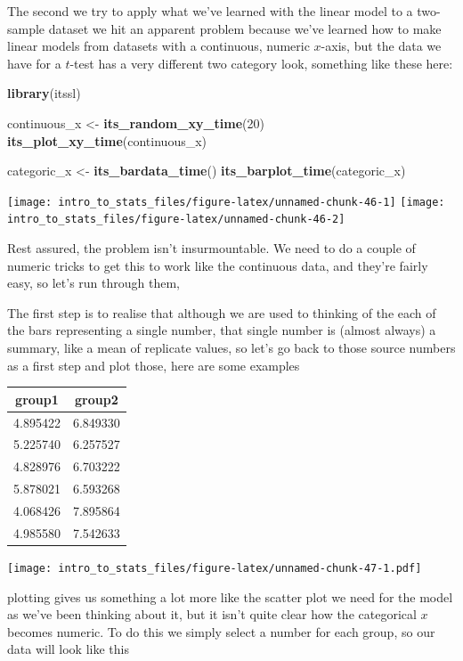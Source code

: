 \documentclass[
]{book}
\newenvironment{Shaded}{\begin{snugshade}}{\end{snugshade}}
\newcommand{\DecValTok}[1]{\textcolor[rgb]{0.00,0.00,0.81}{#1}}
\newcommand{\KeywordTok}[1]{\textcolor[rgb]{0.13,0.29,0.53}{\textbf{#1}}}
\newcommand{\NormalTok}[1]{#1}
\newcommand{\StringTok}[1]{\textcolor[rgb]{0.31,0.60,0.02}{#1}}
\begin{document}
The second we try to apply what we've learned with the linear model to a two-sample dataset we hit an apparent problem because we've learned how to make linear models from datasets with a continuous, numeric \(x\)-axis, but the data we have for a \(t\)-test has a very different two category look, something like these here:

\begin{Shaded}
\begin{Highlighting}[]
\KeywordTok{library}\NormalTok{(itssl)}

\NormalTok{continuous_x <-}\StringTok{ }\KeywordTok{its_random_xy_time}\NormalTok{(}\DecValTok{20}\NormalTok{)}
\KeywordTok{its_plot_xy_time}\NormalTok{(continuous_x)}

\NormalTok{categoric_x <-}\StringTok{ }\KeywordTok{its_bardata_time}\NormalTok{()}
\KeywordTok{its_barplot_time}\NormalTok{(categoric_x)}
\end{Highlighting}
\end{Shaded}

\texttt{[image: intro\_to\_stats\_files/figure-latex/unnamed-chunk-46-1]} \texttt{[image: intro\_to\_stats\_files/figure-latex/unnamed-chunk-46-2]}

Rest assured, the problem isn't insurmountable. We need to do a couple of numeric tricks to get this to work like the continuous data, and they're fairly easy, so let's run through them,

The first step is to realise that although we are used to thinking of the each of the bars representing a single number, that single number is (almost always) a summary, like a mean of replicate values, so let's go back to those source numbers as a first step and plot those, here are some examples

\begin{tabular}{c|c}
\hline
group1 & group2\\
\hline
4.895422 & 6.849330\\
\hline
5.225740 & 6.257527\\
\hline
4.828976 & 6.703222\\
\hline
5.878021 & 6.593268\\
\hline
4.068426 & 7.895864\\
\hline
4.985580 & 7.542633\\
\hline
\end{tabular}

\texttt{[image: intro\_to\_stats\_files/figure-latex/unnamed-chunk-47-1.pdf]}

plotting gives us something a lot more like the scatter plot we need for the model as we've been thinking about it, but it isn't quite clear how the categorical \(x\) becomes numeric. To do this we simply select a number for each group, so our data will look like this
\end{document}
